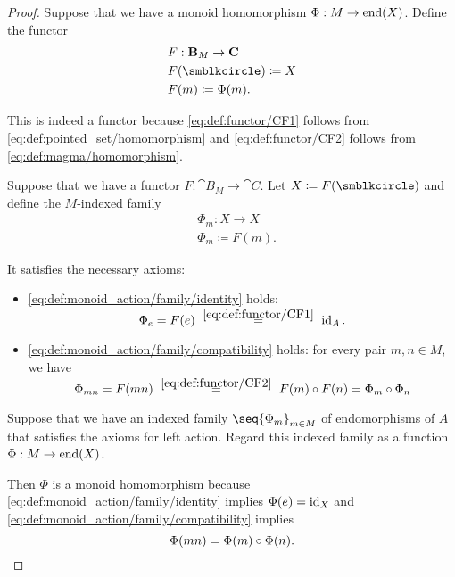 \begin{proof}
   Suppose that we have a monoid homomorphism \( \Phi: M \to \operatorname{end}(X) \). Define the functor
  \begin{equation*}
    \begin{aligned}
      &F: \cat{B}_M \to \cat{C} \\
      &F(\anon) \coloneqq X \\
      &F(m) \coloneqq \Phi(m).
    \end{aligned}
  \end{equation*}

  This is indeed a functor because \eqref{eq:def:functor/CF1} follows from \eqref{eq:def:pointed_set/homomorphism} and \eqref{eq:def:functor/CF2} follows from \eqref{eq:def:magma/homomorphism}.

   Suppose that we have a functor \( F: \cat{B}_M \to \cat{C} \). Let \( X \coloneqq F(\anon) \) and define the \( M \)-indexed family
  \begin{equation*}
    \begin{aligned}
      &\Phi_m: X \to X \\
      &\Phi_m \coloneqq F(m).
    \end{aligned}
  \end{equation*}

  It satisfies the necessary axioms:
  \begin{itemize}
    \item \ref{eq:def:monoid_action/family/identity} holds:
    \begin{equation*}
      \Phi_e
      =
      F(e)
      \reloset {\eqref{eq:def:functor/CF1}} =
      \id_A.
    \end{equation*}

    \item \ref{eq:def:monoid_action/family/compatibility} holds: for every pair \( m, n \in M \), we have
    \begin{equation*}
      \Phi_{mn}
      =
      F(mn)
      \reloset {\eqref{eq:def:functor/CF2}} =
      F(m) \bincirc F(n)
      =
      \Phi_m \bincirc \Phi_n
    \end{equation*}
  \end{itemize}

   Suppose that we have an indexed family \( \seq{ \Phi_m }_{m \in M} \) of endomorphisms of \( A \) that satisfies the axioms for left action. Regard this indexed family as a function \( \Phi: M \to \operatorname{end}(X) \).

  Then \( \Phi \) is a monoid homomorphism because \ref{eq:def:monoid_action/family/identity} implies \( \Phi(e) = \operatorname{id}_X \) and \eqref{eq:def:monoid_action/family/compatibility} implies
  \begin{equation*}
    \Phi(mn) = \Phi(m) \bincirc \Phi(n).
  \end{equation*}
\end{proof}

